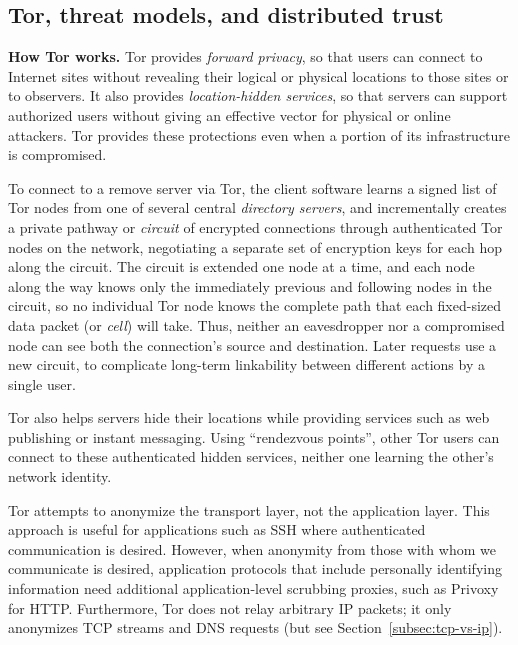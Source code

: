 \documentclass{llncs}
\begin{document}
\subsection{Tor, threat models, and distributed trust}
\label{sec:what-is-tor}


\noindent
{\bf How Tor works.}
Tor provides \emph{forward privacy}, so that users can connect to
Internet sites without revealing their logical or physical locations
to those sites or to observers.  It also provides \emph{location-hidden
services}, so that servers can support authorized users without
giving an effective vector for physical or online attackers.
Tor provides these protections even when a portion of its
infrastructure is compromised.

To connect to a remove server via Tor, the client software learns a signed
list of Tor nodes from one of several central \emph{directory servers}, and
incrementally creates a private pathway or \emph{circuit} of encrypted
connections through authenticated Tor nodes on the network, negotiating a
separate set of encryption keys for each hop along the circuit.  The circuit
is extended one node at a time, and each node along the way knows only the
immediately previous and following nodes in the circuit, so no individual Tor
node knows the complete path that each fixed-sized data packet (or
\emph{cell}) will take.
Thus, neither an eavesdropper nor a compromised node can
see both the connection's source and destination.  Later requests use a new
circuit, to complicate long-term linkability between different actions by
a single user.

Tor also helps servers hide their locations while
providing services such as web publishing or instant
messaging.  Using ``rendezvous points'', other Tor users can
connect to these authenticated hidden services, neither one learning the
other's network identity.

Tor attempts to anonymize the transport layer, not the application layer.
This approach is useful for applications such as SSH
where authenticated communication is desired. However, when anonymity from
those with whom we communicate is desired,
application protocols that include personally identifying information need
additional application-level scrubbing proxies, such as
Privoxy~\cite{privoxy} for HTTP\@.  Furthermore, Tor does not relay arbitrary
IP packets; it only anonymizes TCP streams and DNS requests
(but see Section~\ref{subsec:tcp-vs-ip}).
\end{document}
